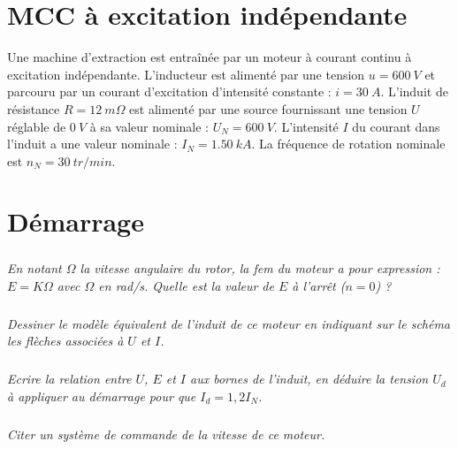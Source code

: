 \documentclass[10pt,fleqn]{article} %
\begin{document}

\vspace{4.5cm}
\pagestyle{fancy}
\thispagestyle{plain}


\def\columnseprulecolor{\color{ocre}}
\setlength{\columnseprule}{0.4pt} 

\ifprof
\begin{multicols}{2}
\else
\begin{multicols}{2}
\fi
\section*{MCC à excitation indépendante}


Une machine d'extraction est entraînée par un moteur à courant continu à excitation
indépendante.
L'inducteur est alimenté par une tension $u = \SI{600}{V}$ et parcouru par un courant d'excitation
d'intensité constante : $i = \SI{30}{A}$.
L'induit de résistance $R = \SI{12}{m \Omega}$ est alimenté par une source fournissant une tension $U$
réglable de $\SI{0}{V}$ à sa valeur nominale : $U_N = \SI{600}{V}$.
L'intensité $I$ du courant dans l'induit a une valeur nominale : $I_N = \SI{1,50}{kA}$.
La fréquence de rotation nominale est $n_N = \SI{30}{tr/min}$. 

\section*{Démarrage}

\subparagraph{}\textit{ En notant $\Omega$ la vitesse angulaire du rotor, la fem du moteur a pour expression : $E = K\Omega$ avec $\Omega$ en rad/s. Quelle est la valeur de $E$ à l'arrêt ($n = 0$) ? 
}
\ifprof
\begin{corrige}
\end{corrige}
\else
\fi

\subparagraph{}\textit{Dessiner le modèle équivalent de l'induit de ce moteur en indiquant sur le schéma les
flèches associées à $U$ et $I$.}
\ifprof
\begin{corrige}
\end{corrige}
\else
\fi
\subparagraph{}\textit{ Ecrire la relation entre $U$, $E$ et $I$ aux bornes de l'induit, en déduire la tension $U_d$ à
appliquer au démarrage pour que $I_d = 1,2 I_N$. }
\ifprof
\begin{corrige}
\end{corrige}
\else
\fi

\subparagraph{}\textit{Citer un système de commande de la vitesse de ce moteur. }
\ifprof
\begin{corrige}
\end{corrige}
\else
\fi


\end{multicols}
\end{multicols}
\end{document}
